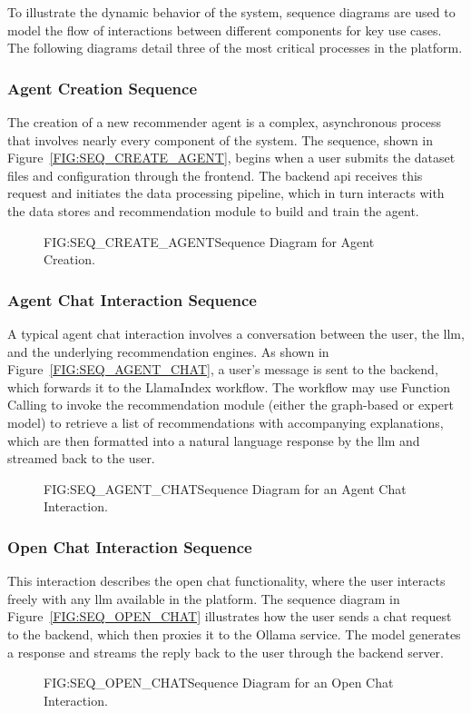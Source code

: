 To illustrate the dynamic behavior of the system, sequence diagrams are used to model the flow of interactions between different components for key use cases. The following diagrams detail three of the most critical processes in the platform.

\subsubsection{Agent Creation Sequence}
The creation of a new recommender agent is a complex, asynchronous process that involves nearly every component of the system. The sequence, shown in Figure~\ref{FIG:SEQ_CREATE_AGENT}, begins when a user submits the dataset files and configuration through the frontend. The backend \acs{api} receives this request and initiates the data processing pipeline, which in turn interacts with the data stores and recommendation module to build and train the agent.

\begin{figure}[Sequence Diagram for Agent Creation]{FIG:SEQ_CREATE_AGENT}{Sequence Diagram for Agent Creation.}
    \centering
    
\end{figure}

\subsubsection{Agent Chat Interaction Sequence}
A typical agent chat interaction involves a conversation between the user, the \ac{llm}, and the underlying recommendation engines. As shown in Figure~\ref{FIG:SEQ_AGENT_CHAT}, a user's message is sent to the backend, which forwards it to the LlamaIndex workflow. The workflow may use Function Calling to invoke the recommendation module (either the graph-based or expert model) to retrieve a list of recommendations with accompanying explanations, which are then formatted into a natural language response by the \ac{llm} and streamed back to the user.

\begin{figure}[Sequence Diagram for an Agent Chat Interaction]{FIG:SEQ_AGENT_CHAT}{Sequence Diagram for an Agent Chat Interaction.}
    \centering
    
\end{figure}

\subsubsection{Open Chat Interaction Sequence}
This interaction describes the open chat functionality, where the user interacts freely with any \ac{llm} available in the platform. The sequence diagram in Figure~\ref{FIG:SEQ_OPEN_CHAT} illustrates how the user sends a chat request to the backend, which then proxies it to the Ollama service. The model generates a response and streams the reply back to the user through the backend server.

\begin{figure}[Sequence Diagram for an Open Chat Interaction]{FIG:SEQ_OPEN_CHAT}{Sequence Diagram for an Open Chat Interaction.}
    \centering
    
\end{figure}